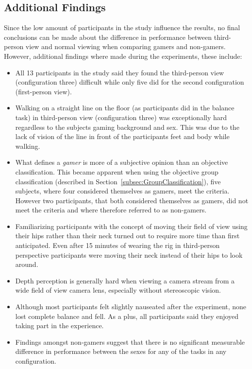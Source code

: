 \documentclass[runningheads,a4paper,oribibl]{llncs}
\begin{document}
\subsection{Additional Findings}
Since the low amount of participants in the study influence the results, no final conclusions can be made about the difference in performance between third-person view and normal viewing when comparing gamers and non-gamers. However, additional findings where made during the experiments, these include:
\begin{itemize}
	\item All 13 participants in the study said they found the third-person view (configuration three) difficult while only five did for the second configuration (first-person view).

	\item Walking on a straight line on the floor (as participants did in the balance task) in third-person view (configuration three) was exceptionally hard regardless to the subjects gaming background and sex. This was due to the lack of vision of the line in front of the participants feet and body while walking. 

	\item What defines a \emph{gamer} is more of a subjective opinion than an objective classification. This became apparent when using the objective group classification (described in Section~\ref{subsec:GroupClassification}), five subjects, where four considered themselves as gamers, meet the criteria. However two participants, that both considered themselves as gamers, did not meet the criteria and where therefore referred to as non-gamers.

	\item Familiarizing participants with the concept of moving their field of view using their hips rather than their neck turned out to require more time than first anticipated. Even after 15 minutes of wearing the rig in third-person perspective participants were moving their neck instead of their hips to look around.

	\item Depth perception is generally hard when viewing a camera stream from a wide field of view camera lens, especially without stereoscopic vision.

	\item Although most participants felt slightly nauseated after the experiment, none lost complete balance and fell. As a plus, all participants said they enjoyed taking part in the experience.

   \item Findings amongst non-gamers suggest that there is no significant measurable difference in performance between the sexes for any of the tasks in any configuration.
\end{itemize}
\end{document}

